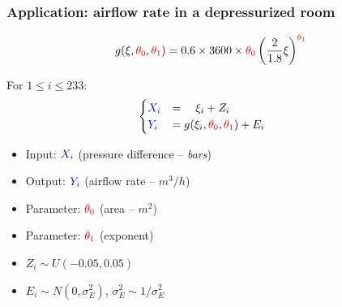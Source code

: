 \documentclass{beamer}
\begin{document}
\begin{frame}
  \frametitle{Application: airflow rate in a depressurized room}
  	\begin{minipage}{\textwidth}

        \begin{equation*}
            g(\xi, \textcolor{red}{\theta_0}, \textcolor{red}{\theta_1})
            =
            0.6 \times 3600 \times \textcolor{red}{\theta_0} \left( \frac{2}{1.8} \xi \right)^{\textcolor{red}{\theta_1}}
        \end{equation*}
 
  	\begin{minipage}{0.35\textwidth}
    For $1 \leqslant i \leqslant 233$:
    \begin{align}
    \begin{cases}
        \textcolor{blue}{X_i} &= \quad \xi_i + Z_i \quad \quad \quad  \quad\; \;  \\%
        \textcolor{blue}{Y_i} &= g(\xi_i, \textcolor{red}{\theta_0}, \textcolor{red}{\theta_1}) + E_i  \nonumber %
    \end{cases}
    \end{align}
	\end{minipage}
	\begin{minipage}{0.60\textwidth}
    	\begin{itemize}
    		\item Input: $\textcolor{blue}{X_i}$ (pressure difference -- \textit{bars})
    		\item Output: $\textcolor{blue}{Y_i}$ (airflow rate -- $m^3/h$) 
    		\item Parameter: $\textcolor{red}{\theta_0}$ (area -- $m^2$)
    		\item Parameter: $\textcolor{red}{\theta_1}$ (exponent)
    	\end{itemize}
	\end{minipage}

    \vspace{0.5cm}
    \begin{minipage}{0.45\textwidth}
        \begin{itemize}
            \item $Z_i \sim U(-0.05, 0.05)$
            \item $E_i \sim N(0, \sigma_E^2)$,  $\sigma_E^2 \sim 1 / \sigma_E^2$


\end{itemize}
\end{minipage}
\end{minipage}
\end{frame}
\end{document}
